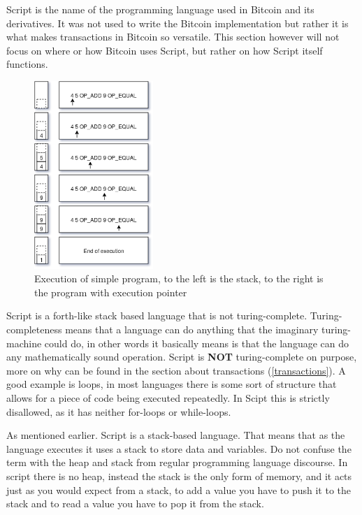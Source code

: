 
Script is the name of the programming language used in Bitcoin and its derivatives. It was not used to write the Bitcoin implementation but rather it is what makes transactions in Bitcoin so versatile. This section however will not focus on where or how Bitcoin uses Script, but rather on how Script itself functions.

\begin{figure}
	\begin{center}
		\includegraphics[width=0.4\textwidth]{background/images/script.png}
	\end{center}
	\vspace{-8mm}
	\caption{Execution of simple program, to the left is the stack, to the right is the program with execution pointer}
	\label{fig:script}
\end{figure}

Script is a forth-like stack based language that is not turing-complete. Turing-completeness means that a language can do anything that the imaginary turing-machine could do, in other words it basically means is that the language can do any mathematically sound operation. Script is \textbf{NOT} turing-complete on purpose, more on why can be found in the section about transactions (\ref{transactions}). A good example is loops, in most languages there is some sort of structure that allows for a piece of code being executed repeatedly. In Scipt this is strictly disallowed, as it has neither for-loops or while-loops. 

As mentioned earlier. Script is a stack-based language. That means that as the language executes it uses a stack to store data and variables. Do not confuse the term with the heap and stack from regular programming language discourse. In script there is no heap, instead the stack is the only form of memory, and it acts just as you would expect from a stack, to add a value you have to push it to the stack and to read a value you have to pop it from the stack.

